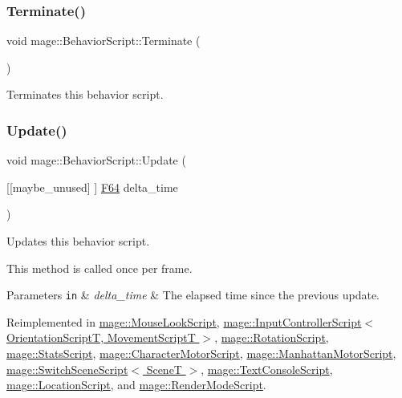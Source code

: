 \subsubsection{\texorpdfstring{Terminate()}{Terminate()}}
{\footnotesize\ttfamily void mage\+::\+Behavior\+Script\+::\+Terminate (\begin{DoxyParamCaption}{ }\end{DoxyParamCaption})\hspace{0.3cm}{\ttfamily [noexcept]}}

Terminates this behavior script. \hypertarget{classmage_1_1_behavior_script_afb9cf3759edf8876416d1df85489cba6}{}\label{classmage_1_1_behavior_script_afb9cf3759edf8876416d1df85489cba6} 
\subsubsection{\texorpdfstring{Update()}{Update()}}
{\footnotesize\ttfamily void mage\+::\+Behavior\+Script\+::\+Update (\begin{DoxyParamCaption}\item[{\mbox{[}\mbox{[}maybe\+\_\+unused\mbox{]} \mbox{]} \hyperlink{namespacemage_ad26233bbec640deda836e572c1a23708}{F64}}]{delta\+\_\+time }\end{DoxyParamCaption})\hspace{0.3cm}{\ttfamily [virtual]}}

Updates this behavior script.

This method is called once per frame.


\begin{DoxyParams}[1]{Parameters}
\mbox{\tt in}  & {\em delta\+\_\+time} & The elapsed time since the previous update. \\
\hline
\end{DoxyParams}


Reimplemented in \hyperlink{classmage_1_1_mouse_look_script_a22cd0ec05722b229e4427fc3f1acf4a4}{mage\+::\+Mouse\+Look\+Script}, \hyperlink{classmage_1_1_input_controller_script_ae964c7b2c90fa2addb32562921376c80}{mage\+::\+Input\+Controller\+Script$<$ Orientation\+Script\+T, Movement\+Script\+T $>$}, \hyperlink{classmage_1_1_rotation_script_a93d00e047d8ca3075d2c52209c769761}{mage\+::\+Rotation\+Script}, \hyperlink{classmage_1_1_stats_script_a61ada9e05bce5699cdf5912cce90337b}{mage\+::\+Stats\+Script}, \hyperlink{classmage_1_1_character_motor_script_a67badc915464773eb874b318bd1f890a}{mage\+::\+Character\+Motor\+Script}, \hyperlink{classmage_1_1_manhattan_motor_script_acc4af968f5a7021adff82d26141188e0}{mage\+::\+Manhattan\+Motor\+Script}, \hyperlink{classmage_1_1_switch_scene_script_a9a92e2f108741599f121dd9083d4a89b}{mage\+::\+Switch\+Scene\+Script$<$ Scene\+T $>$}, \hyperlink{classmage_1_1_text_console_script_afc6fbebca3b5a3bf433777c93e6e27d6}{mage\+::\+Text\+Console\+Script}, \hyperlink{classmage_1_1_location_script_ad7d768404613003a34f754355effe580}{mage\+::\+Location\+Script}, and \hyperlink{classmage_1_1_render_mode_script_af40eef8ffcb392f408ebfa3f5801354a}{mage\+::\+Render\+Mode\+Script}.



